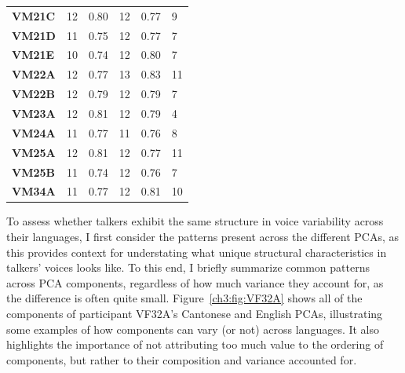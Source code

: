\begin{table}[htbp]
\begin{tabular}{llllll}
    \textbf{VM21C} & 12 & 0.80 & 12 & 0.77 & 9 \\
    \textbf{VM21D} & 11 & 0.75 & 12 & 0.77 & 7 \\
    \textbf{VM21E} & 10 & 0.74 & 12 & 0.80 & 7 \\
    \textbf{VM22A} & 12 & 0.77 & 13 & 0.83 & 11 \\
    \textbf{VM22B} & 12 & 0.79 & 12 & 0.79 & 7 \\
    \textbf{VM23A} & 12 & 0.81 & 12 & 0.79 & 4 \\
    \textbf{VM24A} & 11 & 0.77 & 11 & 0.76 & 8 \\
    \textbf{VM25A} & 12 & 0.81 & 12 & 0.77 & 11 \\
    \textbf{VM25B} & 11 & 0.74 & 12 & 0.76 & 7 \\
    \textbf{VM34A} & 11 & 0.77 & 12 & 0.81 & 10 \\
    \bottomrule
    \end{tabular}
\end{table}

To assess whether talkers exhibit the same structure in voice variability across their languages, I first consider the patterns present across the different PCAs, as this provides context for understating what unique structural characteristics in talkers' voices looks like. To this end, I briefly summarize common patterns across PCA components, regardless of how much variance they account for, as the difference is often quite small. Figure~\ref{ch3:fig:VF32A} shows all of the components of participant VF32A's Cantonese and English PCAs, illustrating some examples of how components can vary (or not) across languages. It also highlights the importance of not attributing too much value to the ordering of components, but rather to their composition and variance accounted for.

